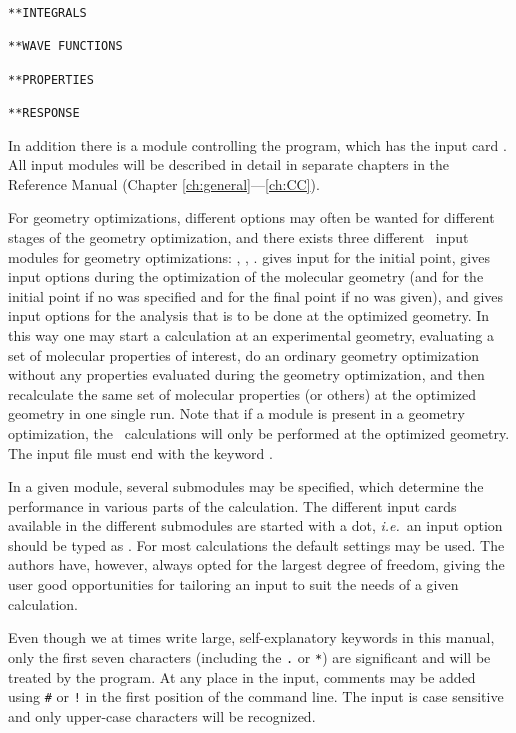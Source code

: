 \begin{verbatim}
**INTEGRALS

**WAVE FUNCTIONS

**PROPERTIES

**RESPONSE
\end{verbatim}

In addition there is a module controlling the {\dalton} program, which
has the input card . All
input modules will be described in detail in separate chapters in the
Reference Manual (Chapter \ref{ch:general}---\ref{ch:CC}).

For geometry optimizations,
different options may often be wanted for different stages of the
geometry optimization, and there exists three different \aba\ input
modules for geometry optimizations: , ,
.  gives input for the initial point,
 gives input options during the optimization of the
molecular geometry
(and for the initial point if no  was specified and for
the final point if no  was  given),
and  gives input options for the
analysis that is to be done at the optimized geometry. In this way one
may start a calculation at an experimental geometry, evaluating a set
of molecular properties of interest, do an ordinary geometry
optimization without any properties evaluated during the geometry
optimization, and then recalculate the same set of molecular
properties (or others) at the optimized geometry in one single run. 
Note that if a  module is present in a geometry optimization,
the \resp\ calculations will only be performed at the optimized geometry. The input file must end with the keyword .

In a given module, several submodules may be
specified, which determine the performance in various parts of the
calculation. The different input cards available
in the different submodules are started with a dot, {\it i.e.}~an input
option should be typed as . For most calculations the
default settings may be used. The authors have, however, always
opted for the largest degree of freedom, giving the user good
opportunities for tailoring an input to suit the needs of a given
calculation.

Even though we at times write large, self-explanatory keywords in this
manual, only the first seven characters (including the \verb|.| or
\verb|*|) are significant and will be
treated by the program. At any
place in the input, comments may be added using
\verb|#| or \verb|!|
in the first position of the command line. The input is case sensitive
and only upper-case characters will be recognized.

